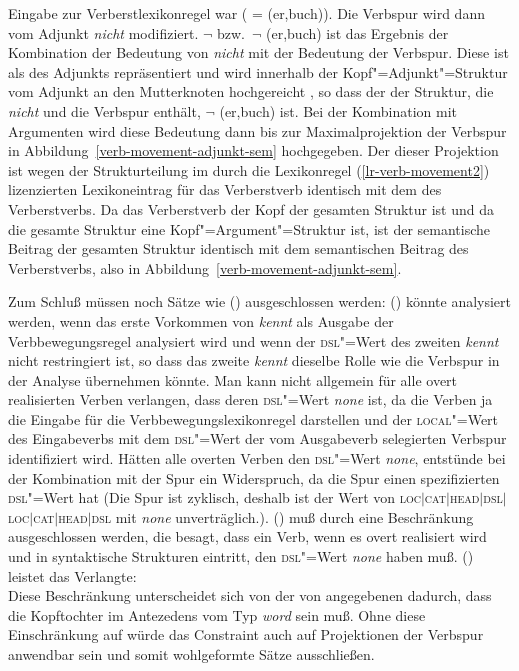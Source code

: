 Eingabe zur Verberstlexikonregel war ( = (er,buch)). Die Verbspur wird dann vom
Adjunkt \emph{nicht} modifiziert. $\neg$  bzw.\ $\neg$ (er,buch) ist das Ergebnis der
Kombination der Bedeutung von \emph{nicht} mit der Bedeutung der Verbspur. Diese ist als \contw des
Adjunkts repräsentiert und wird innerhalb der Kopf"=Adjunkt"=Struktur vom Adjunkt an den Mutterknoten hochgereicht
, so dass der \contw der Struktur, die \emph{nicht} und die Verbspur enthält, $\neg$
(er,buch) ist. Bei der Kombination mit Argumenten wird diese Bedeutung dann bis zur Maximalprojektion
der Verbspur in Abbildung~\ref{verb-movement-adjunkt-sem} hochgegeben. Der \contw dieser Projektion
ist wegen der Strukturteilung im durch die Lexikonregel (\ref{lr-verb-movement2}) lizenzierten
Lexikoneintrag für das Verberstverb identisch mit dem \contw des Verberstverbs.  Da das Verberstverb
der Kopf der gesamten Struktur ist und da die gesamte Struktur eine Kopf"=Argument"=Struktur ist,
ist der semantische Beitrag der gesamten Struktur identisch mit dem semantischen Beitrag des
Verberstverbs, also  in Abbildung~\ref{verb-movement-adjunkt-sem}.

Zum Schluß müssen noch Sätze wie () ausgeschlossen werden:
\z
() könnte analysiert werden, wenn das erste Vorkommen von \emph{kennt} als Ausgabe der Verbbewegungsregel
analysiert wird und wenn der \textsc{dsl}"=Wert des zweiten \emph{kennt} nicht restringiert ist, so dass das
zweite \emph{kennt} dieselbe Rolle wie die Verbspur in der Analyse übernehmen könnte. Man kann nicht allgemein
für alle overt realisierten Verben verlangen, dass deren \textsc{dsl}"=Wert \emph{none} ist, da die Verben ja
die Eingabe für die Verbbewegungslexikonregel darstellen und der \textsc{local}"=Wert des Eingabeverbs mit dem
\textsc{dsl}"=Wert der vom Ausgabeverb selegierten Verbspur identifiziert wird. Hätten alle overten Verben
den \textsc{dsl}"=Wert \emph{none}, entstünde bei der Kombination mit der Spur ein Widerspruch, da die Spur einen
spezifizierten \textsc{dsl}"=Wert hat (Die Spur ist zyklisch, deshalb ist der Wert von \textsc{loc$|$cat$|$\-head$|$\-dsl$|$\-loc$|$\-cat$|$\-head$|$\-dsl}
mit \emph{none} unverträglich.).
() muß durch eine Beschränkung ausgeschlossen werden, die besagt, dass ein Verb, wenn es overt realisiert
wird und in syntaktische Strukturen eintritt, den \textsc{dsl}"=Wert \emph{none} haben muß. () leistet das
Verlangte:
\ea
{} \impl\\
\z
Diese Beschränkung unterscheidet sich von der von \citet[]{Meurers2000b} angegebenen \ua
dadurch, dass die Kopftochter im Antezedens vom Typ \emph{word} sein muß. Ohne diese
Einschränkung auf  würde das Constraint auch auf Projektionen der Verbspur anwendbar sein
und somit wohlgeformte Sätze ausschließen.

